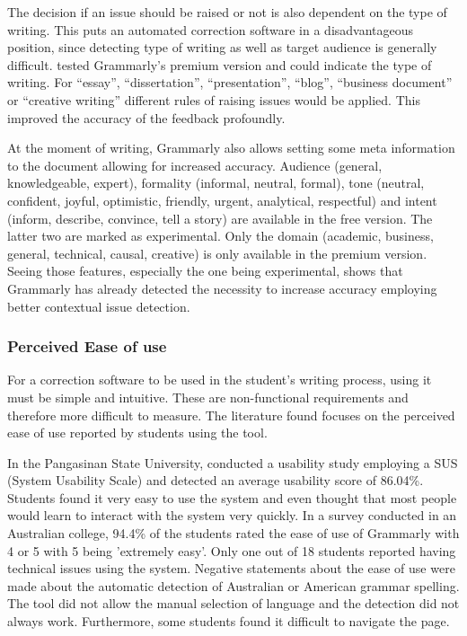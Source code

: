\documentclass[runningheads]{llncs}
\begin{document}
The decision if an issue should be raised or not is also dependent on the type of writing. This puts an automated correction software in a disadvantageous position, since detecting type of writing as well as target audience is generally difficult. \textcite{cavaleri_you_2016} tested Grammarly's premium version and could indicate the type of writing. For ``essay'', ``dissertation'', ``presentation'', ``blog'', ``business document'' or ``creative writing'' different rules of raising issues would be applied. This improved the accuracy of the feedback profoundly.

At the moment of writing, Grammarly also allows setting some meta information to the document allowing for increased accuracy. Audience (general, knowledgeable, expert), formality (informal, neutral, formal), tone (neutral, confident, joyful, optimistic, friendly, urgent, analytical, respectful) and intent (inform, describe, convince, tell a story) are available in the free version. The latter two are marked as experimental. Only the domain (academic, business, general, technical, causal, creative) is only available in the premium version. Seeing those features, especially the one being experimental, shows that Grammarly has already detected the necessity to increase accuracy employing better contextual issue detection.

\subsubsection{Perceived Ease of use}
For a correction software to be used in the student's writing process, using it must be simple and intuitive. These are non-functional requirements and therefore more difficult to measure. The literature found focuses on the perceived ease of use reported by students using the tool.

In the Pangasinan State University, \textcite{ventayen_graduate_2018} conducted a usability study employing a SUS (System Usability Scale) and detected an average usability score of 86.04\%. Students found it very easy to use the system and even thought that most people would learn to interact with the system very quickly. In a survey \citep{cavaleri_you_2016} conducted in an Australian college, 94.4\% of the students rated the ease of use of Grammarly with 4 or 5 with 5 being 'extremely easy'. Only one out of 18 students reported having technical issues using the system. Negative statements about the ease of use were made about the automatic detection of Australian or American grammar spelling. The tool did not allow the manual selection of language and the detection did not always work. Furthermore, some students found it difficult to navigate the page.
\end{document}
